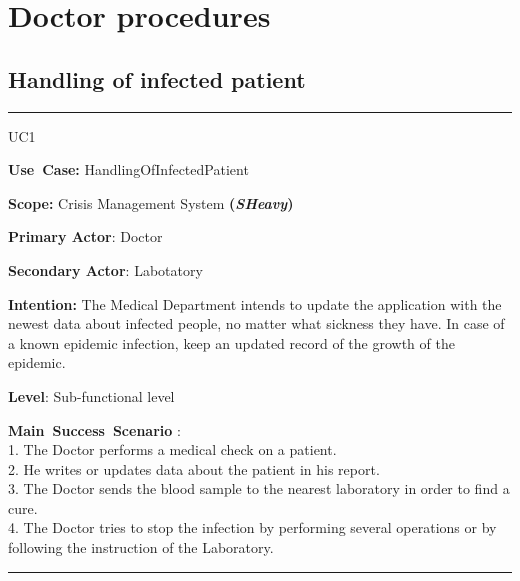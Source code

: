 \section{Doctor procedures}

\subsection{Handling of infected patient}
\vspace{0.5cm}
\hrule
\vspace{0.5cm}
\begin{lyxlist}{UC1}
\small{
\item [\textbf{Use~Case:}] HandlingOfInfectedPatient
\item [\textbf{Scope:}] Crisis Management System \textbf{(\emph{SHeavy})}
\item [\textbf{Primary Actor}:] Doctor
\item [\textbf{Secondary Actor}:] Labotatory
\item [\textbf{Intention:}]The Medical Department intends to update
the application with the newest data about infected people, no matter what
sickness they have. In case of a known epidemic infection, keep an updated
record of the growth of the epidemic.
\item [\textbf{Level}:]Sub-functional level
\item [\textbf{Main~Success~Scenario}]:\\
1. The Doctor performs a medical check on a patient.\\
2. He writes or updates data about the patient in his report.\\
3. The Doctor sends the blood sample to the nearest laboratory in order to find
a cure.\\
4. The Doctor tries to stop the infection by performing several operations or
by following the instruction of the Laboratory.\\
}
\end{lyxlist}
\hrule
\vspace{0.5cm} 

